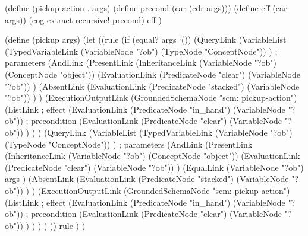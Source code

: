 \begin{python}
(define (pickup-action . args)
  (define precond (car (cdr args)))
  (define eff (car args))
  (cog-extract-recursive! precond)
  eff
)

(define (pickup args)
  (let 
    ((rule
      (if (equal? args `())
        (QueryLink
          (VariableList
            (TypedVariableLink 
              (VariableNode "?ob") 
              (TypeNode "ConceptNode"))
          ) ; parameters
          (AndLink
            (PresentLink
              (InheritanceLink
                (VariableNode "?ob")
                (ConceptNode "object"))
              (EvaluationLink
                (PredicateNode "clear")
                (VariableNode "?ob"))
            )
            (AbsentLink
              (EvaluationLink
                (PredicateNode "stacked")
                (VariableNode "?ob"))
            )
          )
          (ExecutionOutputLink
            (GroundedSchemaNode "scm: pickup-action")
            (ListLink
              ; effect
              (EvaluationLink
                (PredicateNode "in_hand")
                (VariableNode "?ob"))
              ; precondition
              (EvaluationLink
                (PredicateNode "clear")
                (VariableNode "?ob"))
            )
          )
        )
        (QueryLink
          (VariableList
            (TypedVariableLink 
              (VariableNode "?ob") 
              (TypeNode "ConceptNode"))
          ) ; parameters
          (AndLink
            (PresentLink
              (InheritanceLink
                (VariableNode "?ob")
                (ConceptNode "object"))
              (EvaluationLink
                (PredicateNode "clear")
                (VariableNode "?ob"))
            )
            (EqualLink
              (VariableNode "?ob")
              args
            )
            (AbsentLink
              (EvaluationLink
                (PredicateNode "stacked")
                (VariableNode "?ob"))
            )
          )
          (ExecutionOutputLink
            (GroundedSchemaNode "scm: pickup-action")
            (ListLink
              ; effect
              (EvaluationLink
                (PredicateNode "in_hand")
                (VariableNode "?ob"))
              ; precondition
              (EvaluationLink
                (PredicateNode "clear")
                (VariableNode "?ob"))
            )
          )
        )
      )
    ))
    rule
  )
)
\end{python}

